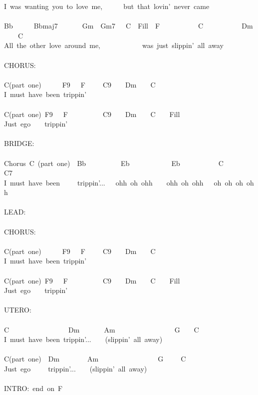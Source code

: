 {I\ was\ wanting\ you\ to\ love\ me,\ \ \ \ \ \ but\ that\ lovin'\ never\ came\\
\\
Bb\ \ \ \ \ \ Bbmaj7\ \ \ \ \ \ \ Gm\ \ Gm7\ \ \ C\ \ Fill\ \ F\ \ \ \ \ \ \ \ \ \ \ C\ \ \ \ \ \ \ \ \ \ \ Dm\ \ \ \ C\\
All\ the\ other\ love\ around\ me,\ \ \ \ \ \ \ \ \ \ \ \ was\ just\ slippin'\ all\ away\\
\\
CHORUS:\ \\
\\
C(part\ one)\ \ \ \ \ \ F9\ \ \ F\ \ \ \ \ C9\ \ \ \ Dm\ \ \ \ C\ \\
I\ must\ have\ been\ trippin'\\
\\
C(part\ one)\ F9\ \ \ F\ \ \ \ \ \ \ \ \ \ C9\ \ \ \ Dm\ \ \ \ C\ \ \ \ Fill\ \\
Just\ ego\ \ \ \ trippin'\ \\
\\
BRIDGE:\\
\\
Chorus\ C\ (part\ one)\ \ Bb\ \ \ \ \ \ \ \ \ \ Eb\ \ \ \ \ \ \ \ \ \ \ \ Eb\ \ \ \ \ \ \ \ \ \ \ C\ \ \ \ \ \ \ \ C7\\
I\ must\ have\ been\ \ \ \ \ trippin'...\ \ \ ohh\ oh\ ohh\ \ \ \ ohh\ oh\ ohh\ \ \ oh\ oh\ oh\ ohh\\
\\
LEAD:\\
\\
CHORUS:\\
\\
C(part\ one)\ \ \ \ \ \ F9\ \ \ F\ \ \ \ \ C9\ \ \ \ Dm\ \ \ \ C\ \\
I\ must\ have\ been\ trippin'\\
\\
C(part\ one)\ F9\ \ \ F\ \ \ \ \ \ \ \ \ \ C9\ \ \ \ Dm\ \ \ \ C\ \ \ \ Fill\ \\
Just\ ego\ \ \ \ trippin'\ \\
\\
UTERO:\ \\
\\
C\ \ \ \ \ \ \ \ \ \ \ \ \ \ \ \ \ Dm\ \ \ \ \ \ \ Am\ \ \ \ \ \ \ \ \ \ \ \ \ \ \ \ \ G\ \ \ \ C\\
I\ must\ have\ been\ trippin'...\ \ \ \ (slippin'\ all\ away)\\
\\
C(part\ one)\ \ Dm\ \ \ \ \ \ \ \ Am\ \ \ \ \ \ \ \ \ \ \ \ \ \ \ \ \ G\ \ \ \ \ C\\
Just\ ego\ \ \ \ \ trippin'...\ \ \ \ (slippin'\ all\ away)\\
\\
INTRO:\ end\ on\ F}

